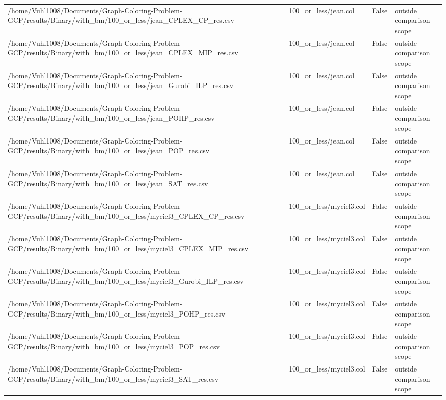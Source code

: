 \begin{table}[htbp]
\begin{tabular}{llll}
/home/Vuhl1008/Documents/Graph-Coloring-Problem-GCP/results/Binary/with\_bm/100\_or\_less/jean\_CPLEX\_CP\_res.csv & 100\_or\_less/jean.col & False & outside comparison scope \\
/home/Vuhl1008/Documents/Graph-Coloring-Problem-GCP/results/Binary/with\_bm/100\_or\_less/jean\_CPLEX\_MIP\_res.csv & 100\_or\_less/jean.col & False & outside comparison scope \\
/home/Vuhl1008/Documents/Graph-Coloring-Problem-GCP/results/Binary/with\_bm/100\_or\_less/jean\_Gurobi\_ILP\_res.csv & 100\_or\_less/jean.col & False & outside comparison scope \\
/home/Vuhl1008/Documents/Graph-Coloring-Problem-GCP/results/Binary/with\_bm/100\_or\_less/jean\_POHP\_res.csv & 100\_or\_less/jean.col & False & outside comparison scope \\
/home/Vuhl1008/Documents/Graph-Coloring-Problem-GCP/results/Binary/with\_bm/100\_or\_less/jean\_POP\_res.csv & 100\_or\_less/jean.col & False & outside comparison scope \\
/home/Vuhl1008/Documents/Graph-Coloring-Problem-GCP/results/Binary/with\_bm/100\_or\_less/jean\_SAT\_res.csv & 100\_or\_less/jean.col & False & outside comparison scope \\
/home/Vuhl1008/Documents/Graph-Coloring-Problem-GCP/results/Binary/with\_bm/100\_or\_less/myciel3\_CPLEX\_CP\_res.csv & 100\_or\_less/myciel3.col & False & outside comparison scope \\
/home/Vuhl1008/Documents/Graph-Coloring-Problem-GCP/results/Binary/with\_bm/100\_or\_less/myciel3\_CPLEX\_MIP\_res.csv & 100\_or\_less/myciel3.col & False & outside comparison scope \\
/home/Vuhl1008/Documents/Graph-Coloring-Problem-GCP/results/Binary/with\_bm/100\_or\_less/myciel3\_Gurobi\_ILP\_res.csv & 100\_or\_less/myciel3.col & False & outside comparison scope \\
/home/Vuhl1008/Documents/Graph-Coloring-Problem-GCP/results/Binary/with\_bm/100\_or\_less/myciel3\_POHP\_res.csv & 100\_or\_less/myciel3.col & False & outside comparison scope \\
/home/Vuhl1008/Documents/Graph-Coloring-Problem-GCP/results/Binary/with\_bm/100\_or\_less/myciel3\_POP\_res.csv & 100\_or\_less/myciel3.col & False & outside comparison scope \\
/home/Vuhl1008/Documents/Graph-Coloring-Problem-GCP/results/Binary/with\_bm/100\_or\_less/myciel3\_SAT\_res.csv & 100\_or\_less/myciel3.col & False & outside comparison scope \\

\end{tabular}
\end{table}
